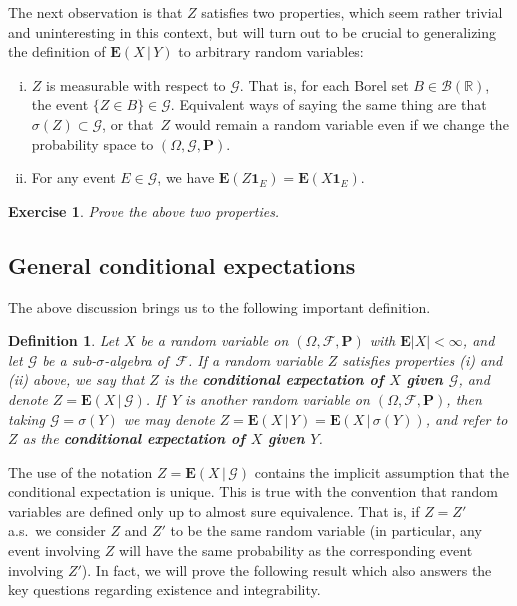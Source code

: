 \documentclass[12pt]{article}
\newtheorem{defi}[thm]{Definition}
\newtheorem{exercise}[thm]{Exercise}
\newcommand{\R}{\mathbb{R}}
\newcommand{\prob}{\mathbf{P}}
\newcommand{\expec}{\mathbf{E}}
\newcommand{\condexp}[2]{\expec\left(#1\,|\,#2\right)}
\newcommand{\ind}{\textbf{1}}
\theoremstyle{example}
\begin{document}
The next observation is that $Z$ satisfies two properties, which seem rather trivial and uninteresting in this context, but will turn out to be crucial to generalizing the definition of $\condexp{X}{Y}$ to arbitrary random variables:

\begin{enumerate}[(i)]
\item
$Z$ is measurable with respect to $\mathcal{G}$. That is, for each Borel set $B\in \mathcal{B}(\R)$, the event $\{Z\in B\} \in \mathcal{G}$. Equivalent ways of saying the same thing are that $\sigma(Z)\subset \mathcal{G}$, or that~$Z$ would remain a random variable even if we change the probability space to $(\Omega,\mathcal{G},\prob)$.

\item For any event $E \in \mathcal{G}$, we have $\expec(Z \ind_E) = \expec(X \ind_E)$.
\end{enumerate}

\begin{exercise} Prove the above two properties.
\end{exercise}


\subsection{General conditional expectations}

The above discussion brings us to the following important definition.

\begin{defi}
Let $X$ be a random variable on $(\Omega, \mathcal{F}, \prob)$ with $\expec|X|<\infty$, and let $\mathcal{G}$ be a sub-$\sigma$-algebra of~$\mathcal{F}$.
If a random variable $Z$ satisfies properties (i) and (ii) above, we say that $Z$ is the \textbf{conditional expectation of $X$ given $\mathcal{G}$}, and denote
$ Z = \condexp{X}{\mathcal{G}}$.
If~$Y$ is another random variable on $(\Omega, \mathcal{F}, \prob)$, then taking $\mathcal{G}=\sigma(Y)$ we may denote
$Z = \condexp{X}{Y} = \condexp{X}{\sigma(Y)}$, and refer to $Z$ as the \textbf{conditional expectation of $X$ given $Y$}.
\end{defi}

The use of the notation $ Z = \condexp{X}{\mathcal{G}}$ contains the implicit assumption that the conditional expectation is unique. This is true with the convention that random variables are defined only up to almost sure equivalence. That is, if $Z=Z'$ a.s.\ we consider $Z$ and $Z'$ to be the same random variable (in particular, any event involving $Z$ will have the same probability as the corresponding event involving $Z'$). In fact, we will prove the following result which also answers the key questions regarding existence and integrability.
\end{document}
